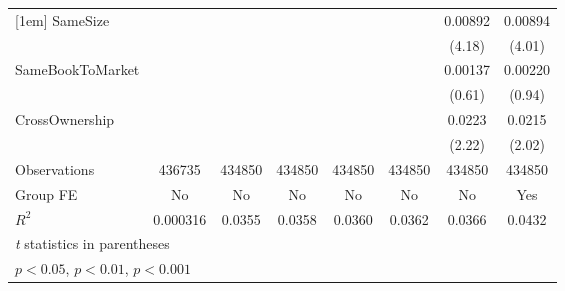 {\begin{tabular}{l*{7}{c}}
[1em]
SameSize        &                  &                  &                  &                  &                  &  0.00892\sym{***}&  0.00894\sym{***}\\
                &                  &                  &                  &                  &                  &   (4.18)         &   (4.01)         \\
[1em]
SameBookToMarket&                  &                  &                  &                  &                  &  0.00137         &  0.00220         \\
                &                  &                  &                  &                  &                  &   (0.61)         &   (0.94)         \\
[1em]
CrossOwnership  &                  &                  &                  &                  &                  &   0.0223\sym{*}  &   0.0215\sym{*}  \\
                &                  &                  &                  &                  &                  &   (2.22)         &   (2.02)         \\
\hline
Observations    &   436735         &   434850         &   434850         &   434850         &   434850         &   434850         &   434850         \\
Group FE        &       No         &       No         &       No         &       No         &       No         &       No         &      Yes         \\
$ R^2 $         & 0.000316         &   0.0355         &   0.0358         &   0.0360         &   0.0362         &   0.0366         &   0.0432         \\
\hline\hline
\multicolumn{8}{l}{\footnotesize \textit{t} statistics in parentheses}\\
\multicolumn{8}{l}{\footnotesize \sym{*} \(p<0.05\), \sym{**} \(p<0.01\), \sym{***} \(p<0.001\)}\\
\end{tabular}
}
